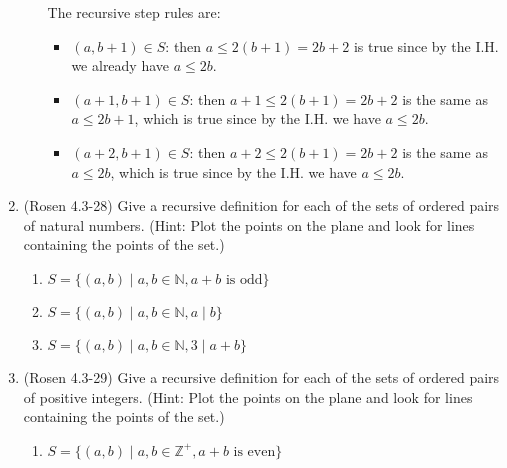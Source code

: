 \begin{enumerate}
\begin{enumerate}
{The recursive step rules are:
\begin{itemize}
\item $(a, b+1) \in S$: then $a \leq 2(b+1) = 2b + 2$ is true
since by the I.H. we already have $a\leq 2b$.
\item $(a+1,b+1) \in S$: then  $a + 1 \leq 2(b+1) = 2b + 2$ is the same
as $a \leq 2b + 1$, which is true since by the I.H. we have $a\leq 2b$.
\item $(a+2,b+1) \in S$: then  $a + 2 \leq 2(b+1) = 2b + 2$ is the same
as $a \leq 2b$, which is true since by the I.H. we have $a\leq 2b$.
\end{itemize}

}
\end{enumerate}

\item (Rosen 4.3-28) Give a recursive definition for each of the 
sets of ordered pairs of natural numbers. 
(Hint: Plot the points on the plane and look for lines containing 
the points of the set.)

\begin{enumerate}
\item \streasy $S=\{(a,b)  \mid  a,b\in \mathbb{N}, a+b \text{~is odd}\}$

\item \strmedium $S=\{(a,b)  \mid  a,b\in \mathbb{N}, a  \mid  b\}$

\item \strmedium $S=\{(a,b)  \mid  a,b\in \mathbb{N}, 3  \mid  a+b\}$
\end{enumerate}

\item (Rosen 4.3-29) Give a recursive definition for each of the 
sets of ordered pairs of positive integers. 
(Hint: Plot the points on the plane and look for lines containing 
the points of the set.)

\begin{enumerate}
\item \strmedium $S=\{(a,b)  \mid  a,b\in \mathbb{Z}^+, a+b \text{~is even}\}$


\end{enumerate}
\end{enumerate}
